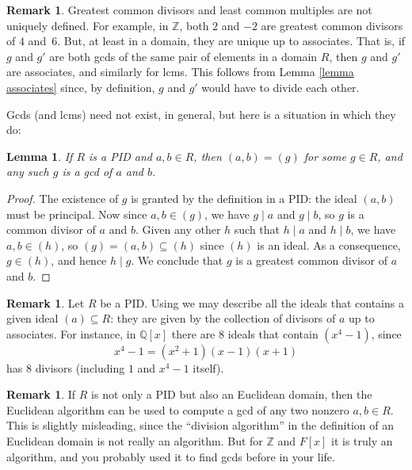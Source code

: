 \documentclass[12pt]{report}
\newtheorem{lemma}[theorem]{Lemma}
\numberwithin{equation}{section}
\numberwithin{theorem}{chapter}
\theoremstyle{definition}
\newtheorem*{basic properties}{Basic Properties}
\newtheorem*{Important Remark}{Important Remark}
\newtheorem{remark}[theorem]{Remark}
\newcommand{\Z}{\mathbb{Z}}
\newcommand{\Q}{\mathbb{Q}}
\begin{document}
\begin{remark} \label{remark uniqueness of gcds}
  Greatest common divisors and least common multiples are not uniquely defined. For example, in $\Z$, both $2$ and $-2$ are greatest common divisors of $4$ and~$6$.
  But, at least  in a domain, they are unique up to associates. That is, if $g$ and $g'$ are both gcds of the same pair of elements in a domain $R$, then $g$
  and $g'$ are associates, and similarly for lcms. This follows from Lemma \ref{lemma associates} since, by definition, $g$ and $g'$ would have to divide each other.
\end{remark}

Gcds (and lcms) need not exist, in general, but here is a situation in which they do:

\begin{lemma}\label{pid gcds}
If $R$ is a PID and $a,b\in R$, then  $(a,b) = (g)$ for some $g \in R$, and any such $g$ is a gcd of $a$ and $b$.
\end{lemma}
 
 
 \begin{proof}
   The existence of $g$ is granted by the definition in a PID: the ideal $(a,b)$ must be principal.
   Now since $a, b \in (g)$, we have $g \mid a$ and $g\mid b$, so $g$ is a common divisor of $a$ and $b$.
   Given any other $h$ such that $h \mid a$ and $h \mid b$, we have $a,b\in (h)$, so $(g)=(a,b)\subseteq (h)$ since $(h)$ is an ideal.
   As a consequence, $g \in (h)$, and hence $h \mid g$. We conclude that $g$ is a greatest common divisor of $a$ and $b$.
\end{proof}


\begin{remark} 
Let $R$ be a PID.
Using 
we may describe all the ideals that contains a given ideal $(a) \subseteq R$: they are given by the collection of divisors of $a$ up to associates. For instance, in $\Q[x]$ there are $8$ ideals that contain $(x^4-1)$, since 
$$x^4-1 = (x^2+1)(x-1)(x+1)$$ 
has $8$ divisors (including $1$ and $x^4-1$ itself).
\end{remark}


\begin{remark} 
If $R$ is not only a PID but also an Euclidean domain, then the Euclidean algorithm can be used to compute a gcd of any two nonzero $a,b\in R$. This is slightly misleading, since the
``division algorithm'' in the definition of an Euclidean domain is not really an algorithm. But for $\Z$ and $F[x]$ it is truly an algorithm, and you probably used it to find gcds
before in your life. 
\end{remark}
\end{document}
